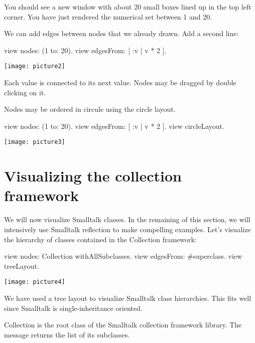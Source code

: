 \documentclass[a4paper,10pt,twoside]{book}
\begin{document}
You should see a new window  with about 20 small boxes lined up in the top left corner. You have just rendered the numerical set between 1 and 20.

We can add edges between nodes that we already drawn. Add a second line:

\begin{code}{}
view nodes: (1 to: 20).
view edgesFrom: [ :v | v * 2 ].
\end{code}
\begin{center}\texttt{[image: picture2]}\end{center}


Each value is connected to its next value. Nodes may be dragged by double clicking on it.

Nodes may be ordered in circule using the circle layout.

\begin{code}{}
view nodes: (1 to: 20).
view edgesFrom: [ :v | v * 2 ].
view circleLayout.
\end{code}
\begin{center}\texttt{[image: picture3]}\end{center}


\section{Visualizing the collection framework}
We will now visualize Smalltalk classes. In the remaining of this section, we will intensively use Smalltalk reflection to make compelling examples. Let's visualize the hierarchy of classes contained in the Collection framework:

\begin{code}{}
view nodes: Collection withAllSubclasses.
view edgesFrom: #superclass.
view treeLayout.
\end{code}
\begin{center}\texttt{[image: picture4]}\end{center}


We have used a tree layout to visualize Smalltalk class hierarchies. This fits well since Smalltalk is single-inheritance oriented.

Collection is the root class of the Smalltalk collection framework library. The message  returns the list of its subclasses.
\end{document}
